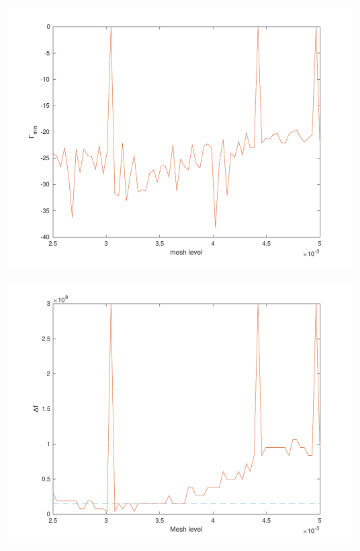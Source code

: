 \documentclass[12pt,a4paper]{article}
\begin{document}
{\begin{figure}[h]
\begin{center}
			\begin{subfigure}{0.3\linewidth}
				\includegraphics[scale=0.3]{minGamma_vs_mesh_level.pdf}
				\caption{}
			\end{subfigure}
			\begin{subfigure}{0.3\linewidth}
				\includegraphics[scale=0.3]{DeltaF_vs_mesh_level.pdf}
				\caption{}
			\end{subfigure}
			\begin{subfigure}{0.3\linewidth}

\end{subfigure}
\end{center}
\end{figure}}
\end{document}
